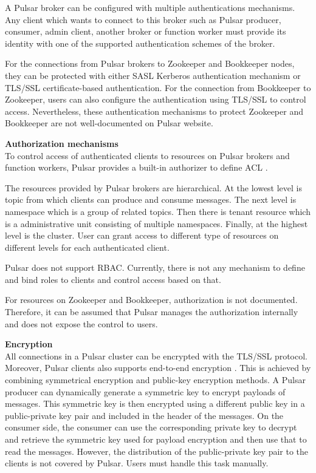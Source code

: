 A Pulsar broker can be configured with multiple authentications mechanisms. Any client which wants to connect to this broker such as Pulsar producer, consumer, admin client, another broker or function worker must provide its identity with one of the supported authentication schemes of the broker. 

For the connections from Pulsar brokers to Zookeeper and Bookkeeper nodes, they can be protected with either SASL Kerberos authentication mechanism or TLS/SSL certificate-based authentication. For the connection from Bookkeeper to Zookeeper, users can also configure the authentication using TLS/SSL to control access. Nevertheless, these authentication mechanisms to protect Zookeeper and Bookkeeper are not well-documented on Pulsar website. 

\textbf{Authorization mechanisms}\\
To control access of authenticated clients to resources on Pulsar brokers and function workers, Pulsar provides a built-in authorizer to define ACL \cite{pulsarsecurity}.

The resources provided by Pulsar brokers are hierarchical. At the lowest level is topic from which clients can produce and consume messages. The next level is namespace which is a group of related topics. Then there is tenant resource which is a administrative unit consisting of multiple namespaces. Finally, at the highest level is the cluster. User can grant access to different type of resources on different levels for each authenticated client.

Pulsar does not support RBAC. Currently, there is not any mechanism to define and bind roles to clients and control access based on that.

For resources on Zookeeper and Bookkeeper, authorization is not documented. Therefore, it can be assumed that Pulsar manages the authorization internally and does not expose the control to users. 

\textbf{Encryption}\\
All connections in a Pulsar cluster can be encrypted with the TLS/SSL protocol. Moreover, Pulsar clients also supports end-to-end encryption \cite{pulsarsecurity}. This is achieved by combining symmetrical encryption and public-key encryption methods. A Pulsar producer can dynamically generate a symmetric key to encrypt payloads of messages. This symmetric key is then encrypted using a different public key in a public-private key pair and included in the header of the messages. On the consumer side, the consumer can use the corresponding private key to decrypt and retrieve the symmetric key used for payload encryption and then use that to read the messages. However, the distribution of the public-private key pair to the clients is not covered by Pulsar. Users must handle this task manually. 

